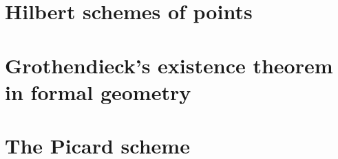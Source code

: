\chapter{Hilbert schemes of points}\label{chap:fga-points}


\chapter{Grothendieck's existence theorem in formal geometry}\label{chap:fga-formal}


\chapter{The Picard scheme}\label{chap:fga-picard}


